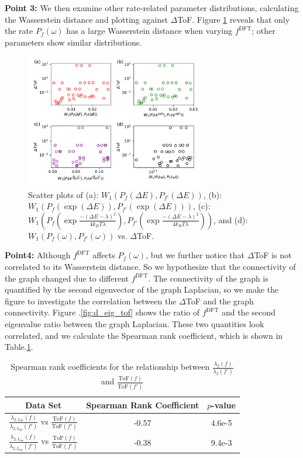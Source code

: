 \documentclass[letterpaper,12pt]{article}
\begin{document}
\textbf{Point 3:} We then examine other rate-related parameter distributions, calculating the Wasserstein distance and plotting against $\Delta$ToF. Figure \ref{fig:d_WD_tof} reveals that only the rate $P_f(\omega)$ has a large Wasserstein distance when varying $f^\text{DFT}$; other parameters show similar distributions.

\begin{figure}[h]
    \centering
    \includegraphics[width=0.7\textwidth]{figs/DeltaToF_W_all.pdf}
    \caption{Scatter plots of (a): $W_1(P_f(\Delta E),P_{f'}(\Delta E))$, (b): $W_1(P_f(\exp(\Delta E)),P_{f'}(\exp(\Delta E)))$, (c): $W_1(P_f(\exp \frac{-(\Delta E - \lambda)^2}{4 k_B T \lambda}),P_{f'}(\exp \frac{-(\Delta E - \lambda)^2}{4 k_B T \lambda}))$, and (d): $W_1 (P_f(\omega), P_{f'}(\omega) )$ vs. $\Delta$ToF.}
    \label{fig:d_WD_tof}
\end{figure}


\textbf{Point4:} Although $f^\text{DFT}$ affects $P_f(\omega)$, but we further notice that $\Delta$ToF is not correlated to its Wasserstein distance. 
So we hypothesize that the connectivity of the graph changed due to different $f^\text{DFT}$. The connectivity of the graph is quantified by the second eigenvector of the graph Laplacian, so we make the figure to investigate the correlation between the $\Delta$ToF and the graph connectivity. 
Figure .\ref{fig:d_eig_tof} shows the ratio of $f^\text{DFT}$ and the second eigenvalue ratio between the graph Laplacian. These two quantities look correlated, and we calculate the Spearman rank coefficient, which is shown in Table.\ref{tab:spearman}.

\begin{table}[h]
    \centering
    \begin{tabular}{c c c}
    \hline
        Data Set & Spearman Rank Coefficient & $p$-value \\ 
        \hline
        $\frac{\lambda_{2,L_W}(f)}{\lambda_{2,L_W}(f')}$ vs $\frac{\text{ToF}(f)}{\text{ToF}(f')}$ & -0.57 & 4.6e-5 \\
        $\frac{\lambda_{2,L_\text{rw}}(f)}{\lambda_{2,L_\text{rw}}(f')}$ vs $\frac{\text{ToF}(f)}{\text{ToF}(f')}$ & -0.38 & 9.4e-3 \\ 
    \hline
    \end{tabular}
    \caption{Spearman rank coefficients for the relationship between $\frac{\lambda_2(f)}{\lambda_2(f')}$ and $\frac{\text{ToF}(f)}{\text{ToF}(f')}$}
    \label{tab:spearman}
\end{table}
\end{document}
